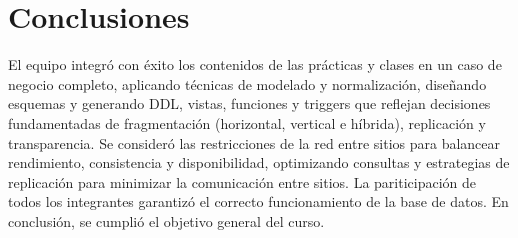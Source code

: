 \documentclass[letterpaper,12pt,oneside]{article}
\begin{document}
\newpage

\section{Conclusiones}

El equipo integró con éxito los contenidos de las prácticas y clases en un caso de negocio completo, aplicando técnicas de modelado y normalización, diseñando esquemas y generando DDL, vistas, funciones y triggers que reflejan decisiones fundamentadas de fragmentación (horizontal, vertical e híbrida), replicación y transparencia. Se consideró las restricciones de la red entre sitios para balancear rendimiento, consistencia y disponibilidad, optimizando consultas y estrategias de replicación para minimizar la comunicación entre sitios. La pariticipación de todos
los integrantes garantizó el correcto funcionamiento de la base de datos. En conclusión, se cumplió el objetivo general del curso.
\end{document}
